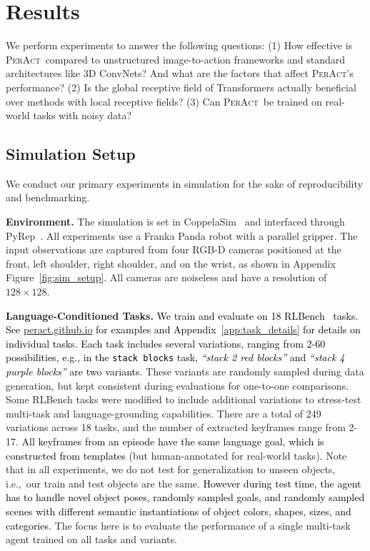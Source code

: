 \documentclass{article}
\newcommand{\appsecref}[1]{Appendix~\ref{#1}}
\newcommand{\appfigref}[1]{Appendix Figure~\ref{#1}}
\newcommand{\ie}{\textrm{i.e.,}\xspace}
\newcommand{\eg}{\textrm{e.g.,}\xspace}
\newcommand{\highlight}[1]{\textcolor{black}{#1}}
\newcommand{\model}{\textsc{PerAct}}
\begin{document}
\section{Results}
\vspace{-0.2cm}
We perform experiments to answer the following questions: (1) How effective is \model~compared to unstructured image-to-action frameworks and standard architectures like 3D ConvNets? And what are the factors that affect \model's performance? (2) Is the global receptive field of Transformers actually beneficial over methods with local receptive fields? (3) Can \model~be trained on real-world tasks with noisy data?

\vspace{-0.2cm}
\subsection{Simulation Setup}
\vspace{-0.2cm}

We conduct our primary experiments in simulation for the sake of reproducibility and benchmarking.

\textbf{Environment.} The simulation is set in CoppelaSim~\citep{coppelasim} and interfaced through PyRep~\citep{james2019pyrep}. All experiments use a Franka Panda robot with a parallel gripper. The input observations are captured from four RGB-D cameras positioned at the front, left shoulder, right shoulder, and on the wrist, as shown in \appfigref{fig:sim_setup}. All cameras are noiseless and have a resolution of $128 \times 128$. 

\textbf{Language-Conditioned Tasks.}  \highlight{We train and evaluate on 18 RLBench~\citep{james2020rlbench} tasks. See \href{https://peract.github.io}{peract.github.io} for examples and \appsecref{app:task_details} for details on individual tasks. Each task includes several variations, ranging from 2-60 possibilities, \eg in the \texttt{stack blocks} task, \textit{``stack 2 red blocks''} and \textit{``stack 4 purple blocks''} are two variants}. These variants are randomly sampled during data generation, but kept consistent during evaluations for one-to-one comparisons. 
Some RLBench tasks were modified to include additional variations to stress-test multi-task and language-grounding capabilities. 
There are a total of 249 variations across 18 tasks, and the number of extracted keyframes range from 2-17.
\highlight{All keyframes from an episode have the same language goal, which is constructed from templates} (but human-annotated for real-world tasks). Note that in all experiments, we do not test for generalization to unseen objects, \ie~our train and test objects are the same. 
\highlight{However during test time, the agent has to handle novel object poses, randomly sampled goals, and randomly sampled scenes with different semantic instantiations of object colors, shapes, sizes, and categories}.
The focus here is to evaluate the performance of a single multi-task agent trained on all tasks and variants.
\end{document}
